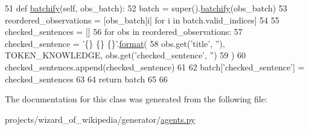 \begin{DoxyCode}
51     \textcolor{keyword}{def }\hyperlink{namespaceparlai_1_1agents_1_1drqa_1_1utils_aca22dd97c5b6dcda2a7479c1cb22ef1e}{batchify}(self, obs\_batch):
52         batch = super().\hyperlink{namespaceparlai_1_1agents_1_1drqa_1_1utils_aca22dd97c5b6dcda2a7479c1cb22ef1e}{batchify}(obs\_batch)
53         reordered\_observations = [obs\_batch[i] \textcolor{keywordflow}{for} i \textcolor{keywordflow}{in} batch.valid\_indices]
54 
55         checked\_sentences = []
56         \textcolor{keywordflow}{for} obs \textcolor{keywordflow}{in} reordered\_observations:
57             checked\_sentence = \textcolor{stringliteral}{'\{\} \{\} \{\}'}.\hyperlink{namespaceparlai_1_1chat__service_1_1services_1_1messenger_1_1shared__utils_a32e2e2022b824fbaf80c747160b52a76}{format}(
58                 obs.get(\textcolor{stringliteral}{'title'}, \textcolor{stringliteral}{''}), TOKEN\_KNOWLEDGE, obs.get(\textcolor{stringliteral}{'checked\_sentence'}, \textcolor{stringliteral}{''})
59             )
60             checked\_sentences.append(checked\_sentence)
61 
62         batch[\textcolor{stringliteral}{'checked\_sentence'}] = checked\_sentences
63 
64         \textcolor{keywordflow}{return} batch
65 
66 
\end{DoxyCode}


The documentation for this class was generated from the following file\+:\begin{DoxyCompactItemize}
\item 
projects/wizard\+\_\+of\+\_\+wikipedia/generator/\hyperlink{projects_2wizard__of__wikipedia_2generator_2agents_8py}{agents.\+py}\end{DoxyCompactItemize}
